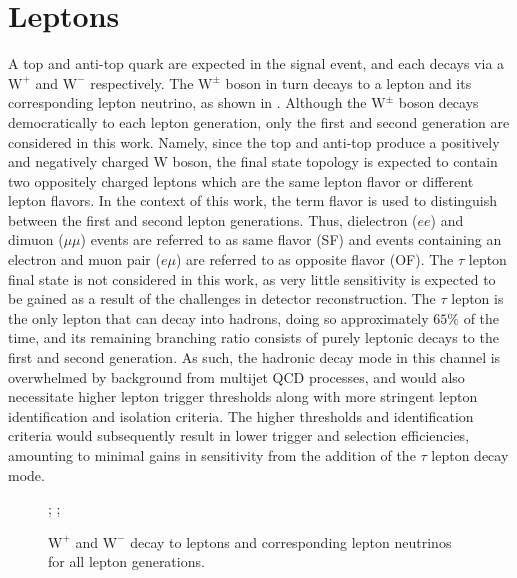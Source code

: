 \section{Leptons}
\label{sec:leps}
A top and anti-top quark are expected in the signal event, and each decays via a $\mathrm{W^+}$ and $\mathrm{W^-}$ respectively. The $\mathrm{W^\pm}$ boson in turn decays to a lepton and its corresponding lepton neutrino, as shown in . Although the $\mathrm{W^\pm}$ boson decays democratically to each lepton generation, only the first and second generation are considered in this work. Namely, since the top and anti-top produce a positively and negatively charged W boson, the final state topology is expected to contain two oppositely charged leptons which are the same lepton flavor or different lepton flavors. In the context of this work, the term flavor is used to distinguish between the first and second lepton generations. Thus, dielectron ($ee$) and dimuon ($\mu\mu$) events are referred to as same flavor (SF) and events containing an electron and muon pair ($e\mu$) are referred to as opposite flavor (OF). The $\tau$ lepton final state is not considered in this work, as very little sensitivity is expected to be gained as a result of the challenges in detector reconstruction. The $\tau$ lepton is the only lepton that can decay into hadrons, doing so approximately $65\%$ of the time, and its remaining branching ratio consists of purely leptonic decays to the first and second generation. As such, the hadronic decay mode in this channel is overwhelmed by background from multijet QCD processes, and would also necessitate higher lepton trigger \pt thresholds along with more stringent lepton identification and isolation criteria. The higher thresholds and identification criteria would subsequently result in lower trigger and selection efficiencies, amounting to minimal gains in sensitivity from the addition of the $\tau$ lepton decay mode.

\begin{figure}
  ;
  ;
  \caption{$\mathrm{W^+}$ and $\mathrm{W^-}$ decay to leptons and corresponding lepton neutrinos for all lepton generations.}
  \label{fig:Wdecay}
\end{figure}

